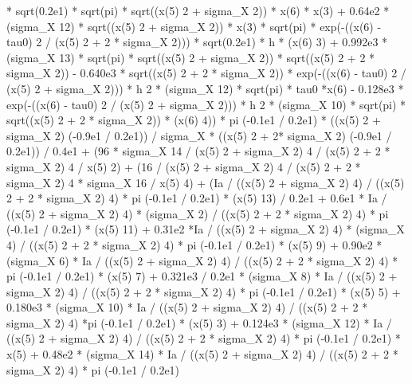 \begin{maplegroup}
* sqrt(0.2e1) * sqrt(pi) * sqrt((x(5)  2 + sigma\_X  2)) * x(6) * x(3) + 0.64e2 * (sigma\_X  12) * sqrt((x(5)  2 + sigma\_X  2)) * x(3) * sqrt(pi) * exp(-((x(6) - tau0)  2 / (x(5)  2 + 2 * sigma\_X  2))) * sqrt(0.2e1) * h * (x(6)  3) + 0.992e3 * (sigma\_X  13) * sqrt(pi) * sqrt((x(5)  2 + sigma\_X  2)) * sqrt((x(5)  2 + 2 * sigma\_X  2)) - 0.640e3 * sqrt((x(5)  2 + 2 * sigma\_X  2)) * exp(-((x(6) - tau0)  2 / (x(5)  2 + sigma\_X  2))) * h  2 * (sigma\_X  12) * sqrt(pi) * tau0 *x(6) - 0.128e3 * exp(-((x(6) - tau0)  2 / (x(5)  2 + sigma\_X  2))) * h  2 * (sigma\_X  10) * sqrt(pi) * sqrt((x(5)  2 + 2 * sigma\_X  2)) * (x(6)  4)) * pi  (-0.1e1 / 0.2e1) * ((x(5)  2 + sigma\_X  2)  (-0.9e1 / 0.2e1)) / sigma\_X * ((x(5)  2 + 2* sigma\_X  2)  (-0.9e1 / 0.2e1)) / 0.4e1 + (96 * sigma\_X  14 / (x(5)  2 + sigma\_X  2)  4 / (x(5)  2 + 2 * sigma\_X  2)  4 / x(5)  2) + (16 / (x(5)  2 + sigma\_X  2)  4 / (x(5)  2 + 2 * sigma\_X  2)  4 * sigma\_X  16 / x(5)  4) + (Ia / ((x(5) 2 + sigma\_X  2)  4) / ((x(5)  2 + 2 * sigma\_X  2)  4) * pi  (-0.1e1 / 0.2e1) * (x(5)  13) / 0.2e1 + 0.6e1 * Ia / ((x(5)  2 + sigma\_X  2)  4) * (sigma\_X  2) / ((x(5)  2 + 2 * sigma\_X  2)  4) * pi  (-0.1e1 / 0.2e1) * (x(5)  11) + 0.31e2 *Ia / ((x(5)  2 + sigma\_X  2)  4) * (sigma\_X  4) / ((x(5)  2 + 2 * sigma\_X  2)  4) * pi  (-0.1e1 / 0.2e1) * (x(5)  9) + 0.90e2 * (sigma\_X  6) * Ia / ((x(5)  2 + sigma\_X  2)  4) / ((x(5)  2 + 2 * sigma\_X  2)  4) * pi  (-0.1e1 / 0.2e1) * (x(5)  7) + 0.321e3 / 0.2e1 * (sigma\_X  8) * Ia / ((x(5)  2 + sigma\_X  2)  4) / ((x(5)  2 + 2 * sigma\_X  2)  4) * pi  (-0.1e1 / 0.2e1) * (x(5)  5) + 0.180e3 * (sigma\_X  10) * Ia / ((x(5)  2 + sigma\_X  2)  4) / ((x(5)  2 + 2 * sigma\_X  2)  4) *pi  (-0.1e1 / 0.2e1) * (x(5)  3) + 0.124e3 * (sigma\_X  12) * Ia / ((x(5)  2 + sigma\_X  2)  4) / ((x(5)  2 + 2 * sigma\_X  2)  4) * pi  (-0.1e1 / 0.2e1) * x(5) + 0.48e2 * (sigma\_X  14) * Ia / ((x(5)  2 + sigma\_X  2)  4) / ((x(5)  2 + 2 * sigma\_X  2)  4) * pi  (-0.1e1 / 0.2e1) 
\end{maplegroup}
